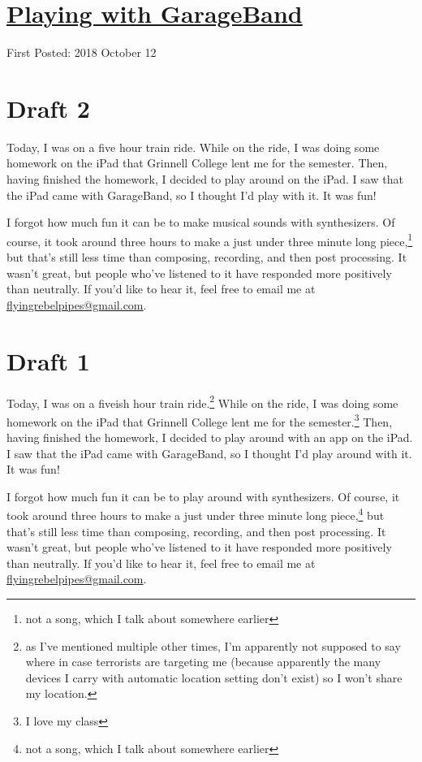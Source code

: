 \documentclass[12pt]{article}[titlepage]
\newcommand{\1}{\={a}}
\newcommand{\2}{\={e}}
\newcommand{\3}{\={\i}}
\newcommand{\4}{\=o}
\newcommand{\5}{\=u}
\newcommand{\6}{\={A}}
\renewcommand{\,}{\textsuperscript{,}}
\begin{document}
\doublespacing
\section{\href{playing-with-garageband.html}{Playing with GarageBand}}
First Posted: 2018 October 12
\section{Draft 2}
Today, I was on a five hour train ride.
While on the ride, I was doing some homework on the iPad that Grinnell College lent me for the semester.
Then, having finished the homework, I decided to play around on the iPad.
I saw that the iPad came with GarageBand, so I thought I'd play with it.
It was fun!

I forgot how much fun it can be to make musical sounds with synthesizers.
Of course, it took around three hours to make a just under three minute long piece,\footnote{not a song, which I talk about somewhere earlier} but that's still less time than composing, recording, and then post processing.
It wasn't great, but people who've listened to it have responded more positively than neutrally.
If you'd like to hear it, feel free to email me at \href{mailto:flyingrebelpipes@gmail.com}{flyingrebelpipes@gmail.com}.
\section{Draft 1}
Today, I was on a fiveish hour train ride.\footnote{as I've mentioned multiple other times, I'm apparently not supposed to say where in case terrorists are targeting me (because apparently the many devices I carry with automatic location setting don't exist) so I won't share my location.}
While on the ride, I was doing some homework on the iPad that Grinnell College lent me for the semester.\footnote{I love my class}
Then, having finished the homework, I decided to play around with an app on the iPad.
I saw that the iPad came with GarageBand, so I thought I'd play around with it.
It was fun!

I forgot how much fun it can be to play around with synthesizers.
Of course, it took around three hours to make a just under three minute long piece,\footnote{not a song, which I talk about somewhere earlier} but that's still less time than composing, recording, and then post processing.
It wasn't great, but people who've listened to it have responded more positively than neutrally.
If you'd like to hear it, feel free to email me at \href{mailto:flyingrebelpipes@gmail.com}{flyingrebelpipes@gmail.com}.
\end{document}

